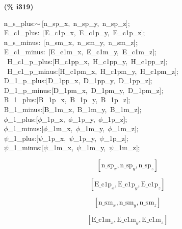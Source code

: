 \documentclass[fleqn]{article}
\begin{document}
\noindent
\begin{minipage}[t]{4.000000em}\color{red}\bfseries
(\% i319)	
\end{minipage}
\begin{minipage}[t]{\textwidth}\color{blue}
n\_s\_plus:\ensuremath{\sim\ }[n\_sp\_x,\ n\_sp\_y,\ n\_sp\_z];\\
E\_c1\_plus:\ [E\_c1p\_x,\ E\_c1p\_y,\ E\_c1p\_z];\\
n\_s\_minus:\ [n\_sm\_x,\ n\_sm\_y,\ n\_sm\_z];\\
E\_c1\_minus:\ [E\_c1m\_x,\ E\_c1m\_y,\ E\_c1m\_z];\\
\ H\_c1\_p\_plus:[H\_c1pp\_x,\ H\_c1pp\_y,\ H\_c1pp\_z];\\
\ H\_c1\_p\_minus:[H\_c1pm\_x,\ H\_c1pm\_y,\ H\_c1pm\_z];\\
D\_1\_p\_plus:[D\_1pp\_x,\ D\_1pp\_y,\ D\_1pp\_z];\\
D\_1\_p\_minus:[D\_1pm\_x,\ D\_1pm\_y,\ D\_1pm\_z];\\
B\_1\_plus:[B\_1p\_x,\ B\_1p\_y,\ B\_1p\_z];\\
B\_1\_minus:[B\_1m\_x,\ B\_1m\_y,\ B\_1m\_z];\\
\ensuremath{\phi}\_1\_plus:[\ensuremath{\phi}\_1p\_x,\ \ensuremath{\phi}\_1p\_y,\ \ensuremath{\phi}\_1p\_z];\ \\
\ensuremath{\phi}\_1\_minus:[\ensuremath{\phi}\_1m\_x,\ \ensuremath{\phi}\_1m\_y,\ \ensuremath{\phi}\_1m\_z];\ \\
\ensuremath{\psi}\_1\_plus:[\ensuremath{\psi}\_1p\_x,\ \ensuremath{\psi}\_1p\_y,\ \ensuremath{\psi}\_1p\_z];\ \\
\ensuremath{\psi}\_1\_minus:[\ensuremath{\psi}\_1m\_x,\ \ensuremath{\psi}\_1m\_y,\ \ensuremath{\psi}\_1m\_z];\ 
\end{minipage}
\[\displaystyle \tag{\% o306} 
\left[ {{\ensuremath{\mathrm{n\_ sp}}}_x}\operatorname{,}{{\ensuremath{\mathrm{n\_ sp}}}_y}\operatorname{,}{{\ensuremath{\mathrm{n\_ sp}}}_z}\right] \mbox{}\]

\[\tag{\% o307} 
\left[ {{\ensuremath{\mathrm{E\_ c1p}}}_x}\operatorname{,}{{\ensuremath{\mathrm{E\_ c1p}}}_y}\operatorname{,}{{\ensuremath{\mathrm{E\_ c1p}}}_z}\right] \mbox{}\]

\[\tag{\% o308} 
\left[ {{\ensuremath{\mathrm{n\_ sm}}}_x}\operatorname{,}{{\ensuremath{\mathrm{n\_ sm}}}_y}\operatorname{,}{{\ensuremath{\mathrm{n\_ sm}}}_z}\right] \mbox{}\]

\[\tag{\% o309} 
\left[ {{\ensuremath{\mathrm{E\_ c1m}}}_x}\operatorname{,}{{\ensuremath{\mathrm{E\_ c1m}}}_y}\operatorname{,}{{\ensuremath{\mathrm{E\_ c1m}}}_z}\right] \mbox{}\]
\end{document}
